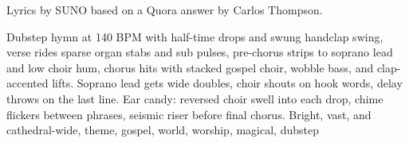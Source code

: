 

\begin{notes}
Lyrics by SUNO based on a Quora answer by Carlos Thompson.
\end{notes}

\begin{style}
Dubstep hymn at 140 BPM with half-time drops and swung handclap swing, verse rides sparse organ stabs and sub pulses, pre-chorus strips to soprano lead and low choir hum, chorus hits with stacked gospel choir, wobble bass, and clap-accented lifts. %
Soprano lead gets wide doubles, choir shouts on hook words, delay throws on the last line. %
Ear candy: reversed choir swell into each drop, chime flickers between phrases, seismic riser before final chorus. %
Bright, vast, and cathedral-wide, theme, gospel, world, worship, magical, dubstep
\end{style}

